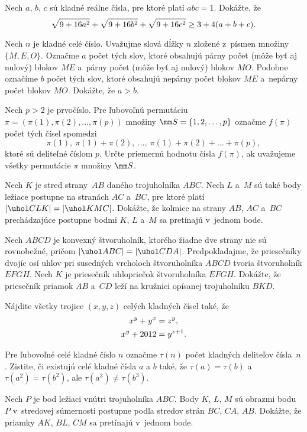 {%
Nech $a$, $b$, $c$ sú kladné reálne čísla, pre ktoré platí $abc=1$. Dokážte, že
$$
\postdisplaypenalty=10000
\sqrt{9+16a^2}+\sqrt{9+16b^2}+\sqrt{9+16c^2} \ge 3+4(a+b+c).
$$
}

{%
Nech $n$ je kladné celé číslo. Uvažujme slová dĺžky $n$ zložené z~písmen množiny $\{M,E,O\}$. Označme $a$ počet tých slov, ktoré obsahujú párny počet (môže byť aj nulový) blokov $ME$ a~párny počet (môže byť aj nulový) blokov $MO$. Podobne označíme $b$ počet tých slov, ktoré obsahujú nepárny počet blokov $ME$ a~nepárny počet blokov $MO$.
Dokážte, že $a>b$.}

{%
Nech $p > 2$ je prvočíslo. Pre ľubovoľnú permutáciu $\pi = (\pi(1),\pi(2),\dots,\pi(p))$ množiny $\mm S = \{1,2,\dots,p\}$ označme $f(\pi)$ počet tých čísel spomedzi
$$
    \pi(1), \ \pi(1)+\pi(2), \ \dots, \ \pi(1)+\pi(2)+\dots+\pi(p),
$$
ktoré sú deliteľné číslom $p$.
Určte priemernú hodnotu čísla $f(\pi)$, ak uvažujeme všetky permutácie $\pi$ množiny $\mm S$.}

{%
Nech $K$ je stred strany~$AB$ daného trojuholníka $ABC$. Nech $L$
a~$M$ sú také body ležiace postupne na stranách $AC$ a~$BC$, pre ktoré platí
$|\uhol CLK|=|\uhol KMC|$. Dokážte, že kolmice na strany
$AB$, $AC$ a~$BC$ prechádzajúce postupne bodmi $K$, $L$ a~$M$ sa pretínajú v~jednom bode.}

{%
Nech $ABCD$ je konvexný štvoruholník, ktorého žiadne dve strany nie sú rovnobežné, pričom $|\uhol ABC|= |\uhol CDA|$.
Predpokladajme, že priesečníky dvojíc osí uhlov pri susedných vrcholoch štvoruholníka $ABCD$ tvoria štvoruholník $EFGH$. Nech $K$ je priesečník uhlopriečok štvoruholníka $EFGH$. Dokážte, že priesečník priamok $AB$ a~$CD$ leží na kružnici opísanej trojuholníku $BKD$.}

{%
Nájdite všetky trojice $(x,y,z)$ celých kladných čísel také, že
$$
\aligned
x^y+y^x&=z^y, \\
x^y+2012&=y^{z+1}.
\endaligned
$$
}

{%
Pre ľubovoľné celé kladné číslo $n$ označme $\tau(n)$ počet kladných deliteľov čísla~$n$.
Zistite, či existujú celé kladné čísla $a$ a $b$ také, že
$\tau(a) = \tau(b)$ a $\tau(a^2)=\tau(b^2)$, ale $\tau(a^3) \ne \tau(b^3)$.}

{%
Nech $P$ je bod ležiaci vnútri trojuholníka $ABC$. Body $K$, $L$, $M$
sú obrazmi bodu~$P$ v~stredovej súmernosti postupne podľa stredov strán
$BC$, $CA$, $AB$. Dokážte, že priamky $AK$, $BL$, $CM$ sa pretínajú v~jednom bode.}

